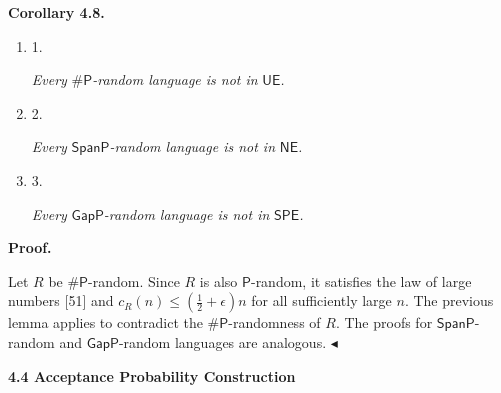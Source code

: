\documentclass[10pt,a4paper]{article}
\begin{document}


\par\medskip\noindent\textbf{
\textbf{Corollary 4.8}\textbf{.}
}\par



\begin{enumerate}


\item[] 
1. 


\emph{Every }${\mathsf{\#}\mathsf{P}}$\emph{-random language is not in }$\mathsf{UE}$\emph{.}\par





\item[] 
2. 


\emph{Every }$\mathsf{SpanP}$\emph{-random language is not in }$\mathsf{NE}$\emph{.}\par





\item[] 
3. 


\emph{Every }$\mathsf{GapP}$\emph{-random language is not in }$\mathsf{SPE}$\emph{.}\par





\end{enumerate}







\par\medskip\noindent\textbf{Proof.}\par




Let $R$ be ${\mathsf{\#}\mathsf{P}}$-random. Since $R$ is also $\mathsf{P}$-random, it satisfies the law of large numbers [51] and $c_{R}(n)\leq(\frac{1}{2}+\epsilon)n$ for all sufficiently large $n$. The previous lemma applies to contradict the ${\mathsf{\#}\mathsf{P}}$-randomness of $R$. The proofs for $\mathsf{SpanP}$-random and $\mathsf{GapP}$-random languages are analogous.
$\blacktriangleleft$\par






\par\medskip\noindent\textbf{
4.4 Acceptance Probability Construction}\par
\end{document}
